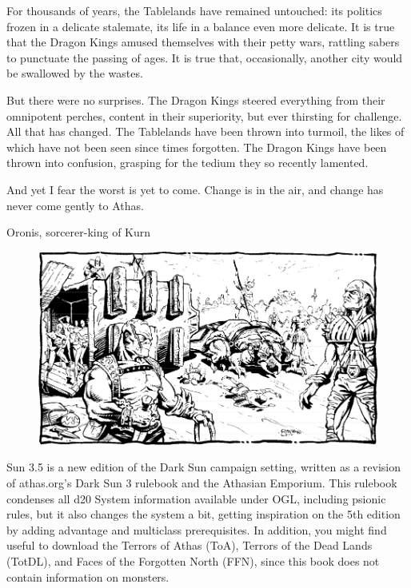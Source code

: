{For thousands of years, the Tablelands have remained untouched: its politics frozen in a delicate stalemate, its life in a balance even more delicate. It is true that the Dragon Kings amused themselves with their petty wars, rattling sabers to punctuate the passing of ages. It is true that, occasionally, another city would be swallowed by the wastes.

But there were no surprises. The Dragon Kings steered everything from their omnipotent perches, content in their superiority, but ever thirsting for challenge. All that has changed. The Tablelands have been thrown into turmoil, the likes of which have not been seen since times forgotten. The Dragon Kings have been thrown into confusion, grasping for the tedium they so recently lamented.

And yet I fear the worst is yet to come. Change is in the air, and change has never come gently to Athas.}{Oronis, sorcerer-king of Kurn}

\begin{figure}[b!]
\centering
\includegraphics[width=\textwidth-1cm]{images/raiders-2.png}
\WOTC
\end{figure}

 Sun 3.5 is a new edition of the {\tableheader Dark Sun} campaign setting, written as a revision of athas.org's {\tableheader Dark Sun} 3 rulebook and the Athasian Emporium. This rulebook condenses all d20 System information available under OGL, including psionic rules, but it also changes the system a bit, getting inspiration on the 5th edition by adding advantage and multiclass prerequisites. In addition, you might find useful to download the Terrors of Athas (ToA), Terrors of the Dead Lands (TotDL), and Faces of the Forgotten North (FFN), since this book does not contain information on monsters.

